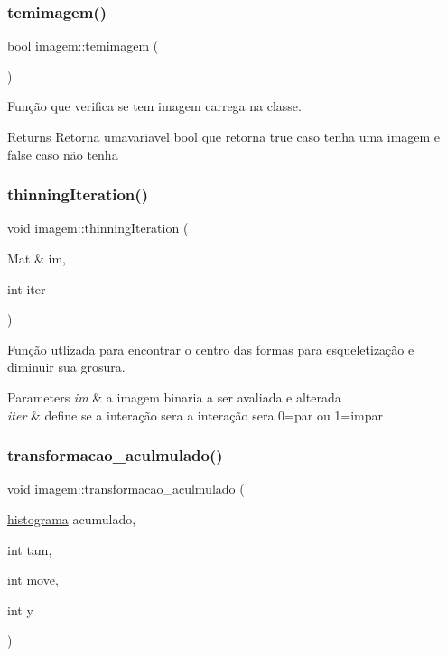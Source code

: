 \subsubsection{\texorpdfstring{temimagem()}{temimagem()}}
{\footnotesize\ttfamily bool imagem\+::temimagem (\begin{DoxyParamCaption}{ }\end{DoxyParamCaption})}



Função que verifica se tem imagem carrega na classe. 

\begin{DoxyReturn}{Returns}
Retorna umavariavel bool que retorna true caso tenha uma imagem e false caso não tenha 
\end{DoxyReturn}
\mbox{\label{classimagem_a37b3c4152a098a5e76195d4600e60ed7}} 
\subsubsection{\texorpdfstring{thinning\+Iteration()}{thinningIteration()}}
{\footnotesize\ttfamily void imagem\+::thinning\+Iteration (\begin{DoxyParamCaption}\item[{Mat \&}]{im,  }\item[{int}]{iter }\end{DoxyParamCaption})}



Função utlizada para encontrar o centro das formas para esqueletização e diminuir sua grosura. 


\begin{DoxyParams}{Parameters}
{\em im} & a imagem binaria a ser avaliada e alterada \\
\hline
{\em iter} & define se a interação sera a interação sera 0=par ou 1=impar \\
\hline
\end{DoxyParams}
\mbox{\label{classimagem_aafd1bd7c1570477c12ddbd76d14c68c9}} 
\subsubsection{\texorpdfstring{transformacao\+\_\+aculmulado()}{transformacao\_aculmulado()}}
{\footnotesize\ttfamily void imagem\+::transformacao\+\_\+aculmulado (\begin{DoxyParamCaption}\item[{\mbox{\hyperlink{classhistograma}{histograma}}}]{acumulado,  }\item[{int}]{tam,  }\item[{int}]{move,  }\item[{int}]{y }\end{DoxyParamCaption})}



